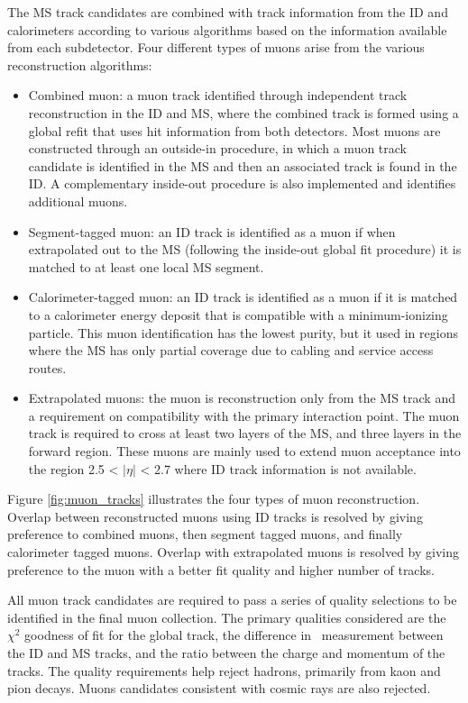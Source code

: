 The MS track candidates are combined with track information from the ID and calorimeters according to various algorithms based on the information available from each subdetector. Four different types of muons arise from the various reconstruction algorithms: 
\begin{itemize}
  \item Combined muon: a muon track identified through independent track reconstruction in the ID and MS, where the combined track is formed using a global refit that uses hit information from both detectors. Most muons are constructed through an outside-in procedure, in which a muon track candidate is identified in the MS and then an associated track is found in the ID. A complementary inside-out procedure is also implemented and identifies additional muons.
  \item Segment-tagged muon: an ID track is identified as a muon if when extrapolated out to the MS (following the inside-out global fit procedure) it is matched to at least one local MS segment. 
  \item Calorimeter-tagged muon: an ID track is identified as a muon if it is matched to a calorimeter energy deposit that is compatible with a minimum-ionizing particle. This muon identification has the lowest purity, but it used in regions where the MS has only partial coverage due to cabling and service access routes.
  \item Extrapolated muons:  the muon is reconstruction only from the MS track and a requirement on compatibility with the primary interaction point. The muon track is required to cross at least two layers of the MS, and three layers in the forward region. These muons are mainly used to extend muon acceptance into the region 2.5 < $|\eta|$ < 2.7 where ID track information is not available.
\end{itemize}

Figure \ref{fig:muon_tracks} illustrates the four types of muon reconstruction. Overlap between reconstructed muons using ID tracks is resolved by giving preference to combined muons, then segment tagged muons, and finally calorimeter tagged muons. Overlap with extrapolated muons is resolved by giving preference to the muon with a better fit quality and higher number of tracks. \par

All muon track candidates are required to pass a series of quality selections to be identified in the final muon collection. The primary qualities considered are the $\chi^2$ goodness of fit for the global track, the difference in \pt~measurement between the ID and MS tracks, and the ratio between the charge and momentum of the tracks. The quality requirements help reject hadrons, primarily from kaon and pion decays. Muons candidates consistent with cosmic rays are also rejected.


